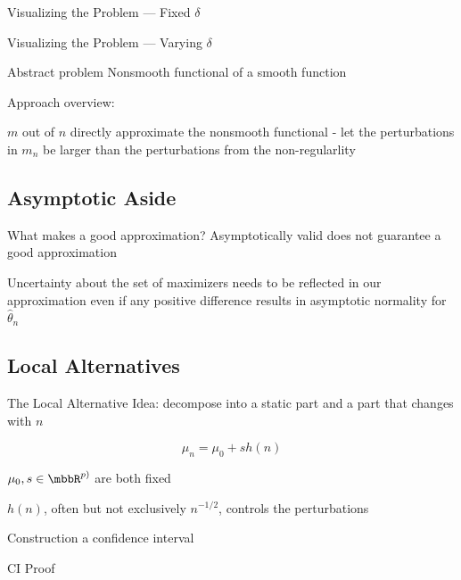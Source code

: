 \documentclass[aspectratio=169, professionalfonts]{beamer}
\begin{document}
\begin{frame}{Visualizing the Problem --- Fixed $\delta$}
\end{frame}

\begin{frame}{Visualizing the Problem --- Varying $\delta$}
\end{frame}

\begin{frame}{Abstract problem}
	Nonsmooth functional of a smooth function

	Approach overview:

	$m$ out of $n$ directly approximate the nonsmooth functional - let the
	perturbations in $m_n$ be larger than the perturbations from the non-regularlity
\end{frame}

\subsection{Asymptotic Aside}

\begin{frame}{What makes a good approximation?}
	Asymptotically valid does not guarantee a good approximation


	Uncertainty about the set of maximizers needs to be reflected in our
	approximation even if any positive difference results in asymptotic
	normality for $\widehat{\theta}_n$
\end{frame}

\subsection{Local Alternatives}
\begin{frame}{The Local Alternative}
	Idea: decompose into a static part and a part that changes with $n$

	$$\mu_n = \mu_0 + s h(n)$$

	$\mu_0, s \in \mbbR^{p)}$ are both fixed

	$h(n)$, often but not exclusively $n^{-1/2}$, controls the perturbations
\end{frame}

\begin{frame}{Construction a confidence interval}
\end{frame}

\begin{frame}{CI Proof}
\end{frame}
\end{document}
